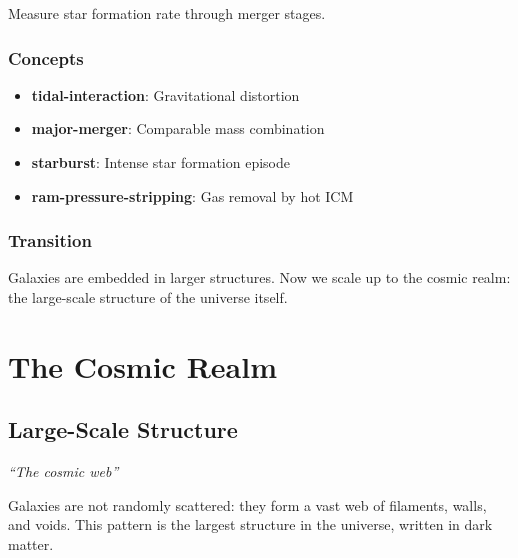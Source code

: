 \documentclass[
  11pt,
  letterpaper,
  twoside,
  openright]{book}
\providecommand{\tightlist}{%
  \setlength{\itemsep}{0pt}\setlength{\parskip}{0pt}}
\begin{document}
Measure star formation rate through merger stages.

\section{Concepts}\label{concepts-27}

\begin{itemize}
\tightlist
\item
  \textbf{tidal-interaction}: Gravitational distortion
\item
  \textbf{major-merger}: Comparable mass combination
\item
  \textbf{starburst}: Intense star formation episode
\item
  \textbf{ram-pressure-stripping}: Gas removal by hot ICM
\end{itemize}

\section{Transition}\label{transition-27}

Galaxies are embedded in larger structures. Now we scale up to the
cosmic realm: the large-scale structure of the universe itself.

\part{The Cosmic Realm}

\chapter{Large-Scale Structure}\label{sec-large-scale-structure}

\emph{``The cosmic web''}

\begin{tcolorbox}[enhanced jigsaw, leftrule=.75mm, title=\textcolor{quarto-callout-note-color}{\faInfo}\hspace{0.5em}{Key Revelation}, bottomrule=.15mm, opacityback=0, coltitle=black, arc=.35mm, colframe=quarto-callout-note-color-frame, colbacktitle=quarto-callout-note-color!10!white, colback=white, titlerule=0mm, breakable, bottomtitle=1mm, toptitle=1mm, rightrule=.15mm, toprule=.15mm, left=2mm, opacitybacktitle=0.6]

Galaxies are not randomly scattered: they form a vast web of filaments,
walls, and voids. This pattern is the largest structure in the universe,
written in dark matter.

\end{tcolorbox}
\end{document}

